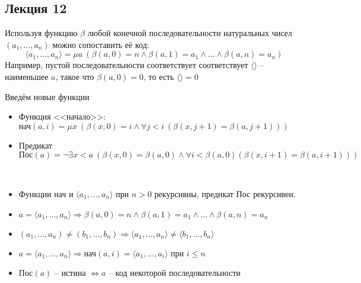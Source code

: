 
\subsection{Лекция 12}

Используя функцию $\beta$ любой конечной последовательности натуральных чисел $(a_1, \ldots, a_n)$ можно сопоставить её код:
$$\langle a_1, \ldots, a_n \rangle = \mu a~(\beta(a, 0)=n\wedge \beta(a, 1)=a_1 \wedge \ldots \wedge \beta(a, n)=a_n)$$
Например, пустой последовательности соответствует соответствует $\langle \rangle $ -- наименьшее $a$, такое что $\beta(a, 0)=0$, то есть $\langle \rangle =0$

Введём новые функции 
\begin{itemize}
    \item Функция <<начало>>: $\text{нач}(a, i)=\mu x~(\beta(x, 0)=i\wedge \forall j<i~(\beta(x, j+1)=\beta(a, j+1)))$
    \item Предикат $\text{Пос}(a) = \neg \exists x<a ~(\beta(x, 0)=\beta(a, 0)\wedge \forall i<\beta(a, 0) (\beta(x, i+1)=\beta(a, i+1)))$ %
\end{itemize}

\begin{prop}\
    \begin{itemize}
        \item Функции $\text{нач}$ и $\langle a_1, \ldots, a_n \rangle $ при $n>0$ рекурсивны, предикат $\text{Пос}$ рекурсивен.
        \item $a=\langle a_1, \ldots, a_n \rangle \Rightarrow \beta(a, 0)=n\wedge\beta(a, 1)=a_1\wedge\ldots\wedge \beta(a, n)=a_n$
        \item $(a_1, \ldots, a_n)\ne(b_1, \ldots, b_n) \Rightarrow \langle a_1, \ldots, a_n\rangle \ne\langle b_1, \ldots, b_n\rangle $
        \item $a = \langle a_1, \ldots, a_n \rangle \Rightarrow \text{нач}(a, i)=\langle a_1, \ldots, a_i\rangle $ при $i\le n$
        \item $\text{Пос}(a)\text{ -- истина } \Leftrightarrow a \text{ -- код некоторой последовательности}$
    \end{itemize}
\end{prop}

